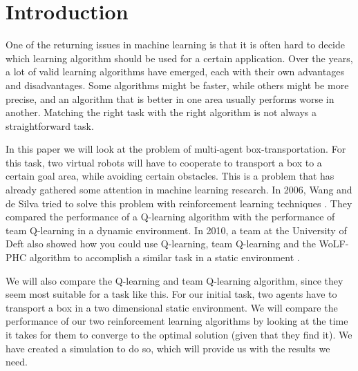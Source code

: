 \section{Introduction}
One of the returning issues in machine learning is that it is often hard to decide which learning algorithm should be used for a certain application. Over the years, a lot of valid learning algorithms have emerged, each with their own advantages and disadvantages. Some algorithms might be faster, while others might be more precise, and an algorithm that is better in one area usually performs worse in another. Matching the right task with the right algorithm is not always a straightforward task.

In this paper we will look at the problem of multi-agent box-transportation.  For this task, two virtual robots will have to cooperate to transport a box to a certain goal area, while avoiding certain obstacles. This is a problem that has already gathered some attention in machine learning research. In 2006, Wang and de Silva tried to solve this problem with reinforcement learning techniques \cite{wang2006}. They compared the performance of a Q-learning algorithm with the performance of team Q-learning in a dynamic environment. In 2010, a team at the University of Deft also showed how you could use Q-learning, team Q-learning and the WoLF-PHC algorithm to accomplish a similar task in a static environment \cite{busoniu2010}.

We will also compare the Q-learning and team Q-learning algorithm, since they seem most suitable for a task like this. For our initial task, two agents have to transport a box in a two dimensional static environment. We will compare the performance of our two reinforcement learning algorithms by looking at the time it takes for them to converge to the optimal solution (given that they find it). We have created a simulation to do so, which will provide us with the results we need.
